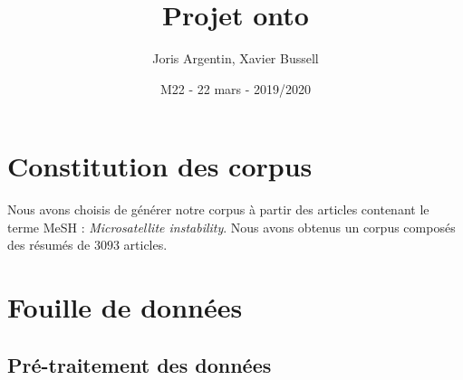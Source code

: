 \documentclass{article}
\title{Projet onto}
\author{Joris Argentin, Xavier Bussell}
\date{M22 - 22 mars - 2019/2020}
\begin{document}
\maketitle

\section{Constitution des corpus}

Nous avons choisis de générer notre corpus à partir des articles contenant le terme MeSH : \emph{Microsatellite instability}.
Nous avons obtenus un corpus composés des résumés de $3093$ articles.

\section{Fouille de données}

\subsection{Pré-traitement des données}
\end{document}
